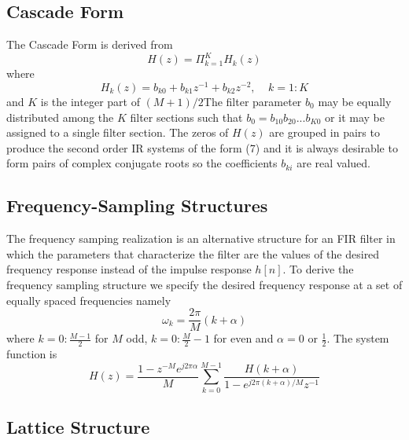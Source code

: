 \documentclass{article} %
\begin{document}
	\subsection{Cascade Form}
	The Cascade Form is derived from
	\begin{equation}
	H(z) = \Pi_{k=1}^KH_k(z)
	\end{equation}
	where
	\begin{equation}
	H_k(z) = b_{k0} + b_{k1}z^{-1} + b_{k2}z^{-2}, \;\;\;\; k = 1:K
	\end{equation}
	and $K$ is the integer part of $(M+1)/2$The filter parameter $b_0$ may be equally distributed among the $K$ filter sections such that $b_0 = b_{10}b_{20}...b_{K0}$ or it may be assigned to a single filter section. The zeros of $H(z)$ are grouped in pairs to produce the second order IR systems of the form (7) and it is always desirable to form pairs of complex conjugate roots so the coefficients $b_{ki}$ are real valued. 
	
	\subsection{Frequency-Sampling Structures}
	The frequency samping realization is an alternative structure for an FIR filter in which the parameters that characterize the filter are the values of the desired frequency response instead of the impulse response $h[n]$. To derive the frequency sampling structure we specify the desired frequency response at a set of equally spaced frequencies namely
	\begin{equation}
	\omega_k = \frac{2\pi}{M}(k+\alpha)
	\end{equation}
	where $k = 0:\frac{M-1}{2}$ for $M$ odd, $k=0:\frac{M}{2}-1$ for even and $\alpha = 0$ or $\frac{1}{2}$. The system function is 
	\begin{equation}
	H(z) = \frac{1-z^{-M}e^{j2\pi \alpha}}{M} \sum_{k=0}^{M-1} \frac{H(k+\alpha)}{1-e^{j2\pi (k+\alpha)/M}z^{-1}}
	\end{equation}
	
	\subsection{Lattice Structure}
\end{document}
